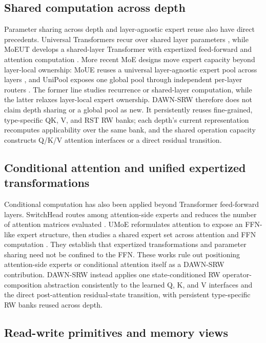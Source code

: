 \documentclass{article}
\newcommand{\DAWN}{DAWN-SRW}
\begin{document}
\subsection{Shared computation across depth}

Parameter sharing across depth and layer-agnostic expert reuse also have direct
precedents. Universal Transformers recur over shared layer parameters
\cite{dehghani2019universal}, while MoEUT develops a shared-layer Transformer
with expertized feed-forward and attention computation
\cite{csordas2024moeut}. More recent MoE designs move expert capacity beyond
layer-local ownership: MoUE reuses a universal layer-agnostic expert pool across
layers \cite{chen2026mixture}, and UniPool exposes one global pool through
independent per-layer routers \cite{huang2026unipool}. The former line studies
recurrence or shared-layer computation, while the latter relaxes layer-local
expert ownership. \DAWN{} therefore does not claim depth sharing or a global
pool as new. It persistently reuses fine-grained, type-specific QK, V, and RST
RW banks; each depth's current representation recomputes applicability over the
same bank, and the shared operation capacity constructs Q/K/V attention
interfaces or a direct residual transition.

\subsection{Conditional attention and unified expertized transformations}

Conditional computation has also been applied beyond Transformer feed-forward
layers. SwitchHead routes among attention-side experts and reduces the number
of attention matrices evaluated \cite{csordas2024switchhead}. UMoE reformulates
attention to expose an FFN-like expert structure, then studies a shared expert
set across attention and FFN computation \cite{yang2025umoe}. They establish
that expertized transformations and parameter sharing need not be confined to
the FFN. These works rule out positioning attention-side experts or conditional
attention itself as a \DAWN{} contribution. \DAWN{} instead applies one
state-conditioned RW operator-composition abstraction consistently to the
learned Q, K, and V interfaces and the direct post-attention residual-state
transition, with persistent type-specific RW banks reused across depth.

\subsection{Read-write primitives and memory views}
\end{document}
